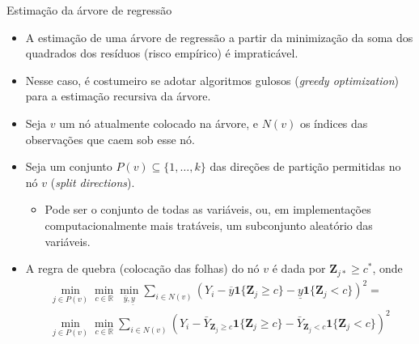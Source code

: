 \documentclass[11pt]{beamer}
\begin{document}
\begin{frame}{Estimação da árvore de regressão}
	\begin{itemize}
		\item A estimação de uma árvore de regressão a partir da minimização da soma dos quadrados dos resíduos (risco empírico) é impraticável.
		\item Nesse caso, é costumeiro se adotar algoritmos gulosos (\textit{greedy optimization}) para a estimação recursiva da árvore.
		\item Seja  $v$ um nó atualmente colocado na árvore, e $N(v)$ os índices das observações que caem sob esse nó.
		\item Seja um conjunto $P(v)\subseteq \{1,\ldots, k\}$ das direções de partição permitidas no nó $v$ (\textit{split directions}).
		\begin{itemize}
			\item Pode ser o conjunto de todas as variáveis, ou, em implementações computacionalmente mais tratáveis, um subconjunto aleatório das variáveis.
		\end{itemize}
		\item A regra de quebra (colocação das folhas) do nó $v$ é dada por $\boldsymbol{Z}_{j*}\geq c^*$, onde
		\begin{equation}
			\begin{aligned}
				\min_{j \in P(v)}\min_{c \in \mathbb{R}} \min_{\overline{y},\underline{y}} \sum_{i \in N(v)}(Y_i - \overline{y}\mathbf{1}\{\boldsymbol{Z}_j\geq c\} - \underline{y} \mathbf{1}\{\boldsymbol{Z}_j< c\})^2 = \\
					\min_{j \in P(v)}\min_{c \in \mathbb{R}} \sum_{i \in N(v)}(Y_i - \bar{Y}_{\boldsymbol{Z}_j\geq c} \mathbf{1}\{\boldsymbol{Z}_j\geq c\} - \bar{Y}_{\boldsymbol{Z}_j< c} \mathbf{1}\{\boldsymbol{Z}_j< c\})^2 
			\end{aligned}
		\end{equation}
	\end{itemize}
\end{frame}
\end{document}
